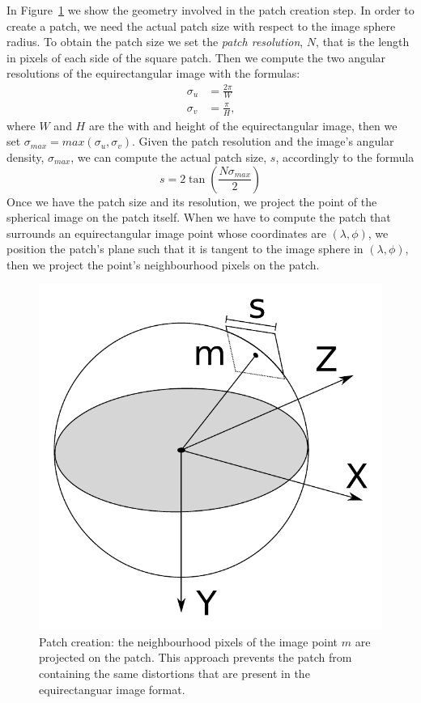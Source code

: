 In Figure~\ref{fig:patch} we show the geometry involved in the
patch creation step. In order to create a patch, we need the actual patch size
with respect to the image sphere radius. To obtain the patch size we set the
\emph{patch resolution}, $N$, that is the length in pixels of each side of the
square patch. Then we compute the two angular
resolutions of the equirectangular image with the formulas:
%
\begin{subequations}
	\label{eq:angular_resolution}
	\begin{align}
	\sigma_u &= \frac{2\pi}{W} \\
	\sigma_v &= \frac{\pi}{H}	\text{,}
	\end{align}
\end{subequations}
%
\noindent where $W$ and $H$ are the with and height of the equirectangular
image, then we set $\sigma_{max} = max(\sigma_u, \sigma_v)$.
Given the patch resolution and the image's angular density, $\sigma_{max}$, we can
compute the actual patch size, $s$, accordingly to the formula
%
\begin{equation*}
s = 2\tan\left(\frac{N\sigma_{max}}{2}\right)
\end{equation*}
%
Once we have the patch size and its resolution, we project the point of the
spherical image on the patch itself.
When we have to compute the patch that surrounds an equirectangular image point
whose coordinates are $(\lambda,\phi)$, we position the patch's plane such that
it is tangent to the image sphere in $(\lambda, \phi)$, then we project
the point's neighbourhood pixels on the patch.
%
\begin{figure}
\centering
\includegraphics[width=0.7\linewidth]{img/patch_creation.pdf}
\caption{Patch creation: the neighbourhood pixels of the image point $m$
are projected on the patch. This approach prevents the patch from containing
the same distortions that are present in the equirectanguar image format.}
	\label{fig:patch}
\end{figure}
%

